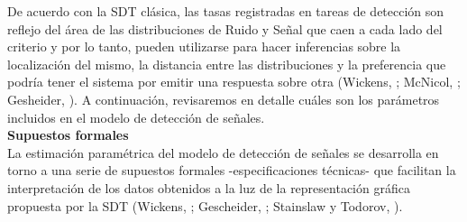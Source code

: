 De acuerdo con la SDT clásica, las tasas registradas en tareas de detección son reflejo del área de las distribuciones de Ruido y Señal que caen a cada lado del criterio y por lo tanto, pueden utilizarse para hacer inferencias sobre la localización del mismo, la distancia entre las distribuciones y la preferencia que podría tener el sistema por emitir una respuesta sobre otra (Wickens, \citeyear{Wickens1}; McNicol, \citeyear{McNicol1}; Gesheider, \citeyear{Gescheider}). A continuación, revisaremos en detalle cuáles son los parámetros incluidos en el modelo de detección de señales.\\

  \textbf{Supuestos formales}\\

La estimación paramétrica del modelo de detección de señales se desarrolla en torno a una serie de supuestos formales -especificaciones técnicas- que facilitan la interpretación de los datos obtenidos a la luz de la representación gráfica propuesta por la SDT (Wickens, \citeyear{Wickens1}; Gescheider, \citeyear{Gescheider}; Stainslaw y Todorov, \citeyear{Stainslaw1999}).\\ 


